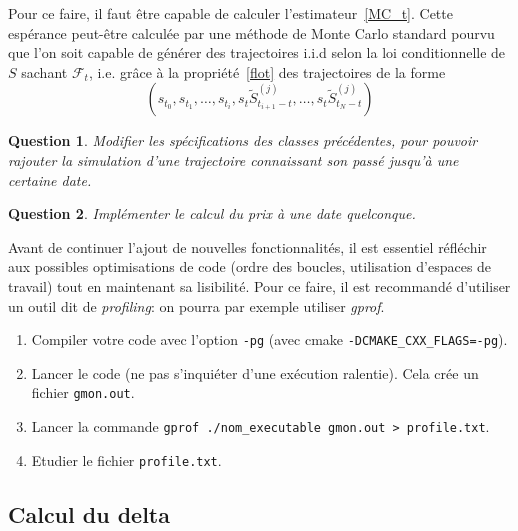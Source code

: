 \documentclass[a4paper,11pt]{article}
\def\cf{{\mathcal F}}
\newtheorem{question}{Question}
\begin{document}
Pour ce faire, il faut être capable de calculer l'estimateur~\eqref{MC_t}.  Cette espérance peut-être calculée par une méthode de Monte Carlo standard pourvu que l'on soit capable de générer des trajectoires i.i.d selon la loi conditionnelle de $S$ sachant $\cf_t$, i.e. grâce à la propriété~\eqref{flot} des trajectoires de la forme
\begin{equation*}
(s_{t_0}, s_{t_1}, \dots, s_{t_i}, s_t \tilde S_{t_{i+1} - t}^{(j)}, \dots,  s_t
\tilde S_{t_N - t}^{(j)})
\end{equation*}

\begin{question}
  Modifier les spécifications des classes précédentes, pour pouvoir rajouter la simulation d'une trajectoire connaissant son passé jusqu'à une certaine date.
\end{question}

\begin{question}
  Implémenter le calcul du prix à une date quelconque.
\end{question}


Avant de continuer l'ajout de nouvelles fonctionnalités, il est essentiel réfléchir aux
possibles optimisations de code (ordre des boucles, utilisation d'espaces de travail) tout
en maintenant sa lisibilité. Pour ce faire, il est recommandé d'utiliser un outil dit de
\emph{profiling}: on pourra par exemple utiliser \emph{gprof}.
\begin{enumerate}
  \item Compiler votre code avec l'option \verb!-pg! (avec cmake \verb!-DCMAKE_CXX_FLAGS=-pg!).
  \item Lancer le code (ne pas s'inquiéter d'une exécution ralentie). Cela crée un fichier \texttt{gmon.out}.
  \item Lancer la commande \texttt{gprof ./nom\_executable gmon.out > profile.txt}.
  \item Etudier le fichier \texttt{profile.txt}.
\end{enumerate}


\subsection{Calcul du delta}
\end{document}

